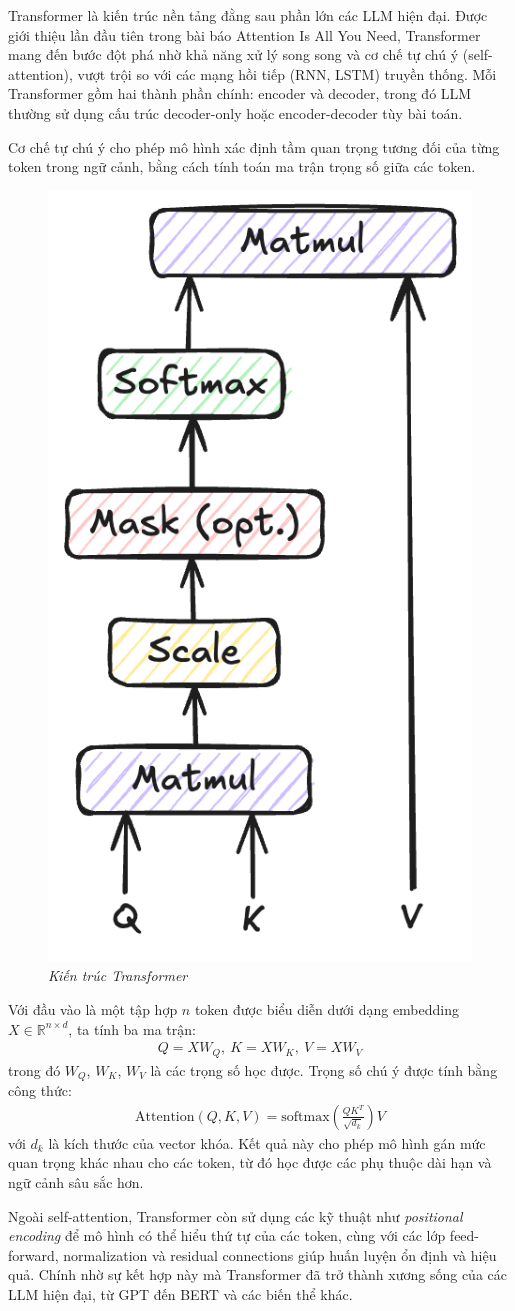 \documentclass{article}
\begin{document}
Transformer là kiến trúc nền tảng đằng sau phần lớn các LLM hiện đại. Được giới thiệu lần đầu tiên trong bài báo Attention Is All You Need, Transformer mang đến bước đột phá nhờ khả năng xử lý song song và cơ chế tự chú ý (self-attention), vượt trội so với các mạng hồi tiếp (RNN, LSTM) truyền thống. Mỗi Transformer gồm hai thành phần chính: encoder và decoder, trong đó LLM thường sử dụng cấu trúc decoder-only hoặc encoder-decoder tùy bài toán.

Cơ chế tự chú ý cho phép mô hình xác định tầm quan trọng tương đối của từng token trong ngữ cảnh, bằng cách tính toán ma trận trọng số giữa các token. 

\begin{figure}[H]
    \centering
    \includegraphics[width=0.2\linewidth]{img/transformer-architecture.png}
    \caption{\textit{Kiến trúc Transformer}}
    \label{2.1.4}
\end{figure}

Với đầu vào là một tập hợp $n$ token được biểu diễn dưới dạng embedding $X\in \mathbb{R}^{n\times d}$, ta tính ba ma trận:
\begin{gather*}
Q = XW_Q,\ K = XW_K,\ V=XW_V
\end{gather*}
trong đó $W_Q$, $W_K$, $W_V$ là các trọng số học được. Trọng số chú ý được tính bằng công thức:
\begin{gather*}
    \text{Attention}(Q,K,V) = \text{softmax}\left(\frac{QK^T}{\sqrt{d_k}}\right)V
\end{gather*}
với $d_k$ là kích thước của vector khóa. Kết quả này cho phép mô hình gán mức quan trọng khác nhau cho các token, từ đó học được các phụ thuộc dài hạn và ngữ cảnh sâu sắc hơn.

Ngoài self-attention, Transformer còn sử dụng các kỹ thuật như \textit{positional encoding} để mô hình có thể hiểu thứ tự của các token, cùng với các lớp feed-forward, normalization và residual connections giúp huấn luyện ổn định và hiệu quả. Chính nhờ sự kết hợp này mà Transformer đã trở thành xương sống của các LLM hiện đại, từ GPT đến BERT và các biến thể khác.
\end{document}
